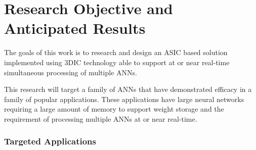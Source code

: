 


\chapter{Research Objective and Anticipated Results}
\label{chap-three}

The goals of this work is to research and design an ASIC based solution implemented using 3DIC technology able to support at or near real-time simultaneous 
processing of multiple ANNs.

This research will target a family of ANNs that have demonstrated efficacy in
a family of popular applications. These applications have large neural networks requiring a large amount of memory 
to support weight storage and the requirement of processing multiple ANNs at or near real-time.

\vspace{-3mm}
\subsection*{Targeted Applications}
\label{sec:Targeted Applications}

